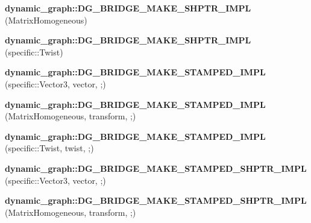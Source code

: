 \begin{DoxyCompactItemize}
\item 
\mbox{\label{namespacedynamic__graph_a15169d3d19abe3ecd077c806664016f2}} 
{\bfseries dynamic\+\_\+graph\+::\+D\+G\+\_\+\+B\+R\+I\+D\+G\+E\+\_\+\+M\+A\+K\+E\+\_\+\+S\+H\+P\+T\+R\+\_\+\+I\+M\+PL} (Matrix\+Homogeneous)
\item 
\mbox{\label{namespacedynamic__graph_a7a18758dda76357a81bb50eeef37a4a7}} 
{\bfseries dynamic\+\_\+graph\+::\+D\+G\+\_\+\+B\+R\+I\+D\+G\+E\+\_\+\+M\+A\+K\+E\+\_\+\+S\+H\+P\+T\+R\+\_\+\+I\+M\+PL} (specific\+::\+Twist)
\item 
\mbox{\label{namespacedynamic__graph_a9ca03447cc73ee1896bd12ada5bb2648}} 
{\bfseries dynamic\+\_\+graph\+::\+D\+G\+\_\+\+B\+R\+I\+D\+G\+E\+\_\+\+M\+A\+K\+E\+\_\+\+S\+T\+A\+M\+P\+E\+D\+\_\+\+I\+M\+PL} (specific\+::\+Vector3, vector, ;)
\item 
\mbox{\label{namespacedynamic__graph_a47d608ba5fa44fed65981f7de3dc5280}} 
{\bfseries dynamic\+\_\+graph\+::\+D\+G\+\_\+\+B\+R\+I\+D\+G\+E\+\_\+\+M\+A\+K\+E\+\_\+\+S\+T\+A\+M\+P\+E\+D\+\_\+\+I\+M\+PL} (Matrix\+Homogeneous, transform, ;)
\item 
\mbox{\label{namespacedynamic__graph_a23c50654f469e1907e043efe96958be7}} 
{\bfseries dynamic\+\_\+graph\+::\+D\+G\+\_\+\+B\+R\+I\+D\+G\+E\+\_\+\+M\+A\+K\+E\+\_\+\+S\+T\+A\+M\+P\+E\+D\+\_\+\+I\+M\+PL} (specific\+::\+Twist, twist, ;)
\item 
\mbox{\label{namespacedynamic__graph_a8555401941f21f8647d7315ab05cf3d6}} 
{\bfseries dynamic\+\_\+graph\+::\+D\+G\+\_\+\+B\+R\+I\+D\+G\+E\+\_\+\+M\+A\+K\+E\+\_\+\+S\+T\+A\+M\+P\+E\+D\+\_\+\+S\+H\+P\+T\+R\+\_\+\+I\+M\+PL} (specific\+::\+Vector3, vector, ;)
\item 
\mbox{\label{namespacedynamic__graph_a23bd5389346b9cb0e93d0190cf26c76d}} 
{\bfseries dynamic\+\_\+graph\+::\+D\+G\+\_\+\+B\+R\+I\+D\+G\+E\+\_\+\+M\+A\+K\+E\+\_\+\+S\+T\+A\+M\+P\+E\+D\+\_\+\+S\+H\+P\+T\+R\+\_\+\+I\+M\+PL} (Matrix\+Homogeneous, transform, ;)
\item 
\mbox{\label{namespacedynamic__graph_ae6414b4a98bb0c734689178f32f4af48}} 

\end{DoxyCompactItemize}
